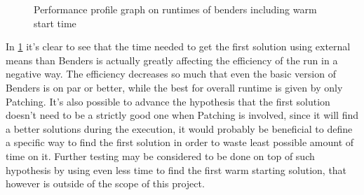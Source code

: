 \begin{figure}[htbp]
	\centering
	\caption{Performance profile graph on runtimes of benders including warm start time \label{fig:bendersFullPerfProf}}
\end{figure}

In \figurename{ \ref{fig:bendersFullPerfProf}} it's clear to see that the time needed to get the first solution using external means than Benders is actually greatly affecting the efficiency of the run in a negative way.
The efficiency decreases so much that even the basic version of Benders is on par or better, while the best for overall runtime is given by only Patching.
It's also possible to advance the hypothesis that the first solution doesn't need to be a strictly good one when Patching is involved, since it will find a better solutions during the execution, it would probably be beneficial to define a specific way to find the first solution in order to waste least possible amount of time on it.
Further testing may be considered to be done on top of such hypothesis by using even less time to find the first warm starting solution, that however is outside of the scope of this project.

